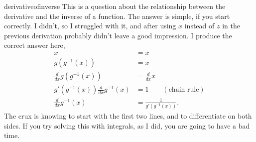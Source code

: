 \begin{answer}{derivativeofinverse}
  This is a question about the relationship between the derivative and the inverse of a function.
  The answer is simple, if you start correctly.
  I didn't, so I struggled with it, and after using $x$ instead of $z$ in the previous derivation                                       probably didn't leave a good impression.
  I produce the correct answer here,
\begin{align*}
  x &= x \\
  g(g^{-1}(x)) &= x \\
 \frac{d}{dx} g(g^{-1}(x)) &= \frac{d}{dx} x \\
  g'(g^{-1}(x))   \frac{d}{dx} g^{-1}(x) &= 1  \qquad (\text{chain rule})\\
 \frac{d}{dx} g^{-1}(x) &= \frac{1}{g'(g^{-1}(x))}
    \text{.}
\end{align*}
The crux is knowing to start with the first two lines, and to differentiate on both sides.
If you try solving this with integrals, as I did, you are going to have a bad time.
\end{answer}
